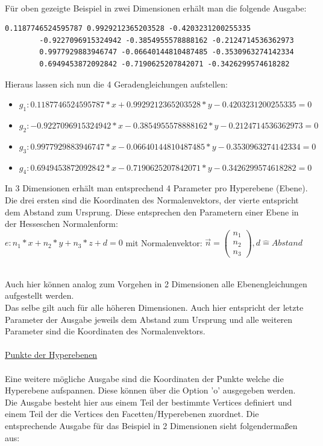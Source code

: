 \documentclass[12pt]{scrartcl}
\begin{document}
\ \\

Für oben gezeigte Beispiel in zwei Dimensionen erhält man die folgende Ausgabe:
\begin{lstlisting}[style=Terminal, caption={Ausgabe von qconvex mit Option 'n'},captionpos=b]
        0.1187746524595787 0.9929212365203528 -0.4203231200255335 
        -0.9227096915324942 -0.3854955578888162 -0.2124714536362973 
        0.9977929883946747 -0.06640144810487485 -0.3530963274142334 
        0.6949453872092842 -0.7190625207842071 -0.3426299574618282 
\end{lstlisting}

 
Hieraus lassen sich nun die 4 Geradengleichungen aufstellen:
\begin{itemize}
    \item $g_1: 0.1187746524595787*x + 0.9929212365203528*y - 0.4203231200255335 = 0 $
    \item $g_2: -0.9227096915324942*x - 0.3854955578888162*y - 0.2124714536362973 = 0 $
    \item $g_3: 0.9977929883946747*x - 0.06640144810487485*y - 0.3530963274142334 = 0 $
    \item $g_4: 0.6949453872092842*x - 0.7190625207842071*y - 0.3426299574618282 = 0 $
\end{itemize}


In 3 Dimensionen erhält man entsprechend 4 Parameter pro Hyperebene (Ebene). Die drei ersten sind die Koordinaten des Normalenvektors, der vierte entspricht dem Abstand zum Ursprung. Diese entsprechen den Parametern einer Ebene in der Hesseschen Normalenform:\\

$ e: n_1*x+n_2*y+n_3*z+d = 0 $ mit Normalenvektor: $\vec{n} = \begin{pmatrix}n_1 \\ n_2 \\ n_3\end{pmatrix}, d \widehat{=} Abstand$

\ \\
Auch hier können analog zum Vorgehen in 2 Dimensionen alle Ebenengleichungen aufgestellt werden.\\
Das selbe gilt auch für alle höheren Dimensionen. Auch hier entspricht der letzte Parameter der Ausgabe jeweils dem Abstand zum Ursprung und alle weiteren Parameter sind die Koordinaten des Normalenvektors.\\

\ \\
\underline{Punkte der Hyperebenen}\\~\\
Eine weitere mögliche Ausgabe sind die Koordinaten der Punkte welche die Hyperebene aufspannen. Diese können über die Option 'o' ausgegeben werden. Die Ausgabe besteht hier aus einem Teil der bestimmte Vertices definiert und einem Teil der die Vertices den Facetten/Hyperebenen zuordnet. Die entsprechende Ausgabe für das Beispiel in 2 Dimensionen sieht folgendermaßen aus:
\end{document}
